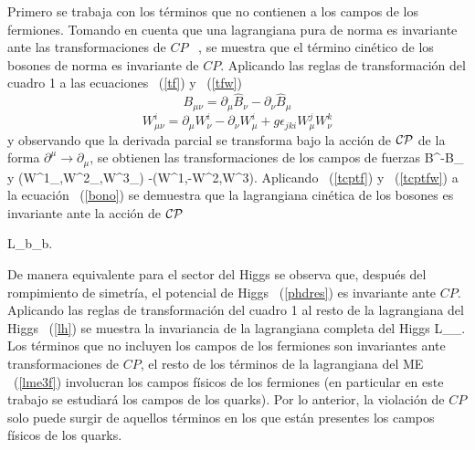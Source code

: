 Primero se trabaja con los t\'erminos que no contienen a los campos de los 
fermiones. Tomando en cuenta que una lagrangiana pura de norma es invariante 
ante las transformaciones de $CP$ ~\cite{Gri199501}, se muestra que el t\'ermino
cin\'etico de los bosones de norma es invariante de $CP$. Aplicando las reglas 
de transformaci\'on del cuadro 1 a las ecuaciones ~(\ref{tf}) y ~(\ref{tfw})
$$B_{\mu\nu}=\partial_{\mu}\hat B_{\nu}-\partial_{\nu}\hat B_{\mu}$$
$$W^i_{\mu\nu}=\partial_{\mu}W^i_{\nu}-\partial_{\nu}W^i_{\mu}+g\epsilon_{jki}
W^j_{\mu}W^k_{\nu}$$
y observando que la derivada parcial se transforma bajo la acci\'on de 
${\cal CP}$ de la forma $\partial^{\mu}\rightarrow\partial_{\mu}$, se obtienen 
las transformaciones de los campos de fuerzas
\be\label{tcptf}
B^{\mu\nu}\fcp-B_{\mu\nu}
\ee
y
\be\label{tcptfw}
\left(W^1_{\mu\nu},W^2_{\mu\nu},W^3_{\mu\nu}\right)\fcp
-\left(W^{1\mu\nu},-W^{2\mu\nu},W^{3\mu\nu}\right).
\ee
Aplicando ~(\ref{tcptf}) y ~(\ref{tcptfw}) a la ecuaci\'on ~(\ref{bono}) se 
demuestra que la lagrangiana cin\'etica de los bosones es invariante ante la 
acci\'on de ${\cal CP}$

\be\label{invCPlb}
{\cal L}_b_b.
\ee

De manera equivalente para el sector del Higgs se observa que, despu\'es del 
rompimiento de simetr\'ia, el potencial de Higgs ~(\ref{phdres}) es invariante 
ante $CP$. Aplicando las reglas de transformaci\'on del cuadro 1 al resto de la
lagrangiana del Higgs ~(\ref{lh}) se muestra la invariancia de la lagrangiana
completa del Higgs
\be\label{invCPlh}
{\cal L}_{\Phi}_{\Phi}.
\ee
Los t\'erminos que no incluyen los campos de los fermiones son invariantes ante 
transformaciones de $CP$, el resto de los t\'erminos de la lagrangiana del ME 
~(\ref{lme3f}) involucran los campos f\'isicos de los fermiones (en particular
en este trabajo se estudiar\'a los campos de los quarks). Por lo anterior, la 
violaci\'on de $CP$ solo puede surgir de aquellos t\'erminos en los que est\'an 
presentes los campos f\'isicos de los quarks. 

